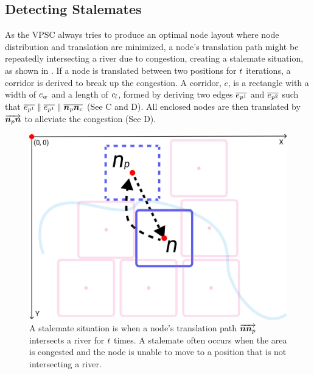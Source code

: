\subsection{Detecting Stalemates}

As the VPSC always tries to produce an optimal node layout where node distribution and translation are minimized, a node's translation path might be repeatedly intersecting a river due to congestion, creating a stalemate situation, as shown in . If a node is translated between two positions for $ t $ iterations, a corridor is derived to break up the congestion. A corridor, $ c $, is a rectangle with a width of $ c_w $ and a length of $ c_l $, formed by deriving two edges $ \protect\overline{e_{p^1}} $ and $ \protect\overline{e_{p^2}} $ such that $ \protect\overline{e_{p^1}} \parallel \protect\overline{e_{p^1}} \parallel \protect\overline{\bm{n}_{p}\bm{n}_c} $ (See C and D). All enclosed nodes are then translated by $ \protect\overrightarrow{\bm{n}_{p}\bm{n}} $ to alleviate the congestion (See D).

{
\begin{figure}[tb!]
    \centering
    \includegraphics[width=\columnwidth]{figure/stalemate.png}
    \caption{A stalemate situation is when a node's translation path $ \protect\overrightarrow{\bm{n}\bm{n}_{p}} $ intersects a river for $ t $ times. A stalemate often occurs when the area is congested and the node is unable to move to a position that is not intersecting a river.}
    \label{fig:stalemate}
\end{figure}
}

